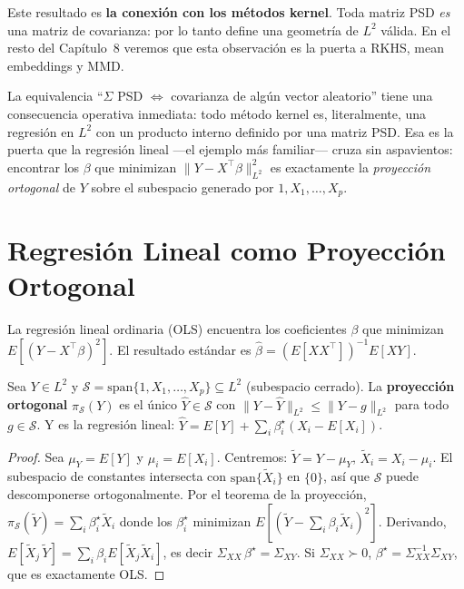 \begin{remark}
	Este resultado es \textbf{la conexión con los métodos kernel}.  Toda matriz
	PSD \emph{es} una matriz de covarianza: por lo tanto define una geometría de
	$L^2$ válida.  En el resto del Capítulo~8 veremos que esta observación es
	la puerta a RKHS, mean embeddings y MMD.
\end{remark}

\bigskip
\noindent
La equivalencia ``$\Sigma$ PSD $\Leftrightarrow$ covarianza de algún vector aleatorio'' tiene una consecuencia operativa inmediata: todo método kernel es, literalmente, una regresión en $L^2$ con un producto interno definido por una matriz PSD. Esa es la puerta que la regresión lineal ---el ejemplo más familiar--- cruza sin aspavientos: encontrar los $\beta$ que minimizan $\|Y - X^\top\beta\|^2_{L^2}$ es exactamente la \emph{proyección ortogonal} de $Y$ sobre el subespacio generado por $1, X_1, \ldots, X_p$.

\section{Regresión Lineal como Proyección Ortogonal}

La regresión lineal ordinaria (OLS) encuentra los coeficientes $\beta$ que
minimizan $E[(Y - X^\top\beta)^2]$.  El resultado estándar es
$\hat\beta = (E[XX^\top])^{-1}E[XY]$.

\begin{theorem}[OLS = proyección ortogonal en $L^2$]
	\label{thm:ols-projection}
	Sea $Y \in L^2$ y $\mathcal{S} = \mathrm{span}\{1, X_1, \dots, X_p\}
	\allowbreak\subseteq L^2$ (subespacio cerrado).  La \textbf{proyección ortogonal}
	$\pi_\mathcal{S}(Y)$ es el único $\hat Y \in \mathcal{S}$ con
	$\|Y - \hat Y\|_{L^2} \le \|Y - g\|_{L^2}$ para todo $g \in \mathcal{S}$.
	Y es la regresión lineal: $\hat Y = E[Y] + \sum_i \beta^\star_i(X_i - E[X_i])$.
\end{theorem}

\begin{proof}
	Sea $\mu_Y = E[Y]$ y $\mu_i = E[X_i]$.  Centremos: $\widetilde Y = Y - \mu_Y$,
	$\widetilde X_i = X_i - \mu_i$.  El subespacio de constantes intersecta con
	$\mathrm{span}\{\widetilde X_i\}$ en $\{0\}$, así que $\mathcal{S}$ puede
	descomponerse ortogonalmente.  Por el teorema de la proyección,
	$\pi_\mathcal{S}(\widetilde Y) = \sum_i \beta^\star_i \widetilde X_i$ donde
	los $\beta^\star_i$ minimizan $E[(\widetilde Y - \sum_i \beta_i \widetilde
	X_i)^2]$.  Derivando, $E[\widetilde X_j\, \widetilde Y] = \sum_i \beta_i
	E[\widetilde X_j \widetilde X_i]$, es decir
	$\Sigma_{X X}\, \beta^\star = \Sigma_{XY}$.  Si $\Sigma_{XX} \succ 0$,
	$\beta^\star = \Sigma_{XX}^{-1}\Sigma_{XY}$, que es exactamente OLS.
\end{proof}

